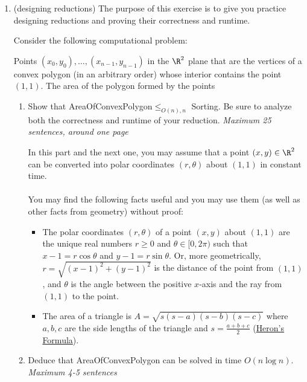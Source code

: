 \documentclass[11pt]{article}
\begin{document}
\begin{enumerate}
     \item  (designing reductions) 
     The purpose of this exercise is to give you practice designing reductions and proving their correctness and runtime.

    Consider the following computational problem:

    {Points $(x_0,y_0),\ldots,(x_{n-1},y_{n-1})$ in the $\R^2$ plane that are the vertices of a convex polygon (in an arbitrary order) whose interior contains the point $(1,1)$.}
    {The area of the polygon formed by the points}

    \begin{enumerate}
        \item \label{part:polar} 
        Show that AreaOfConvexPolygon$\leq_{O(n),n}$ Sorting.  Be sure to analyze both the correctness and runtime of your reduction. \textit{Maximum 25 sentences, around one page}

        In this part and the next one, you may assume that a point $(x,y)\in \R^2$ can be converted into polar coordinates $(r,\theta)$ about $(1,1)$ in constant time. 
        \\\\
        You may find the following facts useful and you may use them (as well as other facts from geometry) without proof:
        \begin{itemize}
            \item The polar coordinates $(r,\theta)$ of a point $(x,y)$ about $(1,1)$ are the unique real numbers $r\geq 0$ and $\theta\in [0,2\pi)$ such that $x-1=r\cos \theta$ and $y-1=r\sin \theta$. Or, more geometrically, $r=\sqrt{(x-1)^2+(y-1)^2}$ is the distance of the point from $(1,1)$, and $\theta$ is the angle between the positive $x$-axis and the ray from $(1,1)$ to the point.
            \item The area of a triangle is $A = \sqrt{s(s-a)(s-b)(s-c)}$ where $a, b, c$ are the side lengths of the triangle and $s = \frac{a + b + c}{2}$ (\href{https://en.wikipedia.org/wiki/Heron\%27s_formula}{Heron's Formula}).
        \end{itemize}

        \item Deduce that AreaOfConvexPolygon can be solved in time $O(n\log n)$. \textit{Maximum 4-5 sentences}


\end{enumerate}
\end{enumerate}
\end{document}
